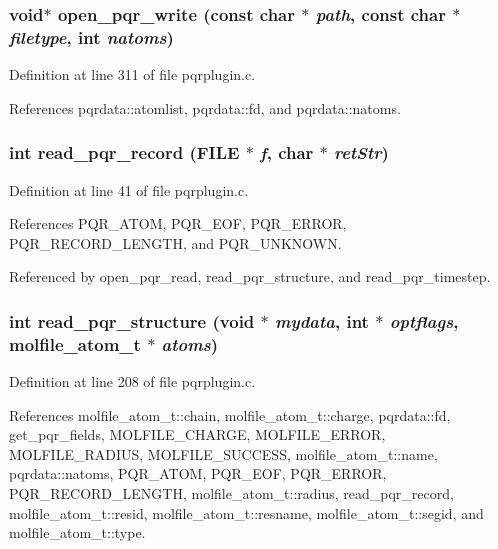 \subsubsection{\setlength{\rightskip}{0pt plus 5cm}void$\ast$ open\_\-pqr\_\-write (const char $\ast$ {\em path}, const char $\ast$ {\em filetype}, int {\em natoms})\hspace{0.3cm}{\tt  [static]}}\label{pqrplugin_8c_a16}




Definition at line 311 of file pqrplugin.c.

References pqrdata::atomlist, pqrdata::fd, and pqrdata::natoms.
\subsubsection{\setlength{\rightskip}{0pt plus 5cm}int read\_\-pqr\_\-record (FILE $\ast$ {\em f}, char $\ast$ {\em ret\-Str})\hspace{0.3cm}{\tt  [static]}}\label{pqrplugin_8c_a7}




Definition at line 41 of file pqrplugin.c.

References PQR\_\-ATOM, PQR\_\-EOF, PQR\_\-ERROR, PQR\_\-RECORD\_\-LENGTH, and PQR\_\-UNKNOWN.

Referenced by open\_\-pqr\_\-read, read\_\-pqr\_\-structure, and read\_\-pqr\_\-timestep.
\subsubsection{\setlength{\rightskip}{0pt plus 5cm}int read\_\-pqr\_\-structure (void $\ast$ {\em mydata}, int $\ast$ {\em optflags}, {\bf molfile\_\-atom\_\-t} $\ast$ {\em atoms})\hspace{0.3cm}{\tt  [static]}}\label{pqrplugin_8c_a13}




Definition at line 208 of file pqrplugin.c.

References molfile\_\-atom\_\-t::chain, molfile\_\-atom\_\-t::charge, pqrdata::fd, get\_\-pqr\_\-fields, MOLFILE\_\-CHARGE, MOLFILE\_\-ERROR, MOLFILE\_\-RADIUS, MOLFILE\_\-SUCCESS, molfile\_\-atom\_\-t::name, pqrdata::natoms, PQR\_\-ATOM, PQR\_\-EOF, PQR\_\-ERROR, PQR\_\-RECORD\_\-LENGTH, molfile\_\-atom\_\-t::radius, read\_\-pqr\_\-record, molfile\_\-atom\_\-t::resid, molfile\_\-atom\_\-t::resname, molfile\_\-atom\_\-t::segid, and molfile\_\-atom\_\-t::type.
